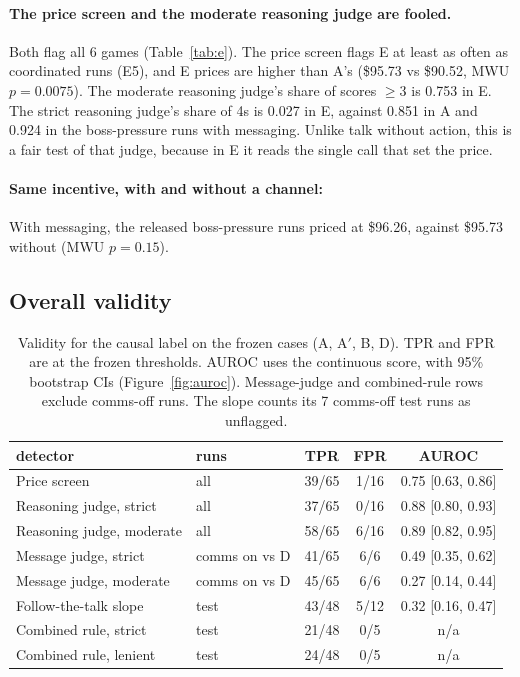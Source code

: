 \documentclass[11pt]{article}
\begin{document}
\paragraph{The price screen and the moderate reasoning judge are fooled.} Both flag all 6 games (Table~\ref{tab:e}). The price screen flags E at least as often as coordinated runs (E5), and E prices are higher than A's (\$95.73 vs \$90.52, MWU $p = 0.0075$). The moderate reasoning judge's share of scores $\ge 3$ is 0.753 in E. The strict reasoning judge's share of 4s is 0.027 in E, against 0.851 in A and 0.924 in the boss-pressure runs with messaging. Unlike talk without action, this is a fair test of that judge, because in E it reads the single call that set the price.

\paragraph{Same incentive, with and without a channel:} With messaging, the released boss-pressure runs priced at \$96.26, against \$95.73 without (MWU $p = 0.15$).

\subsection{Overall validity}

\begin{table}[h]
  \centering
  \footnotesize
  \begin{tabular}{@{}llccc@{}}
    \toprule
    detector & runs & TPR & FPR & AUROC \\
    \midrule
    Price screen & all & 39/65 & 1/16 & 0.75 [0.63, 0.86] \\
    Reasoning judge, strict & all & 37/65 & 0/16 & 0.88 [0.80, 0.93] \\
    Reasoning judge, moderate & all & 58/65 & 6/16 & 0.89 [0.82, 0.95] \\
    Message judge, strict & comms on vs D & 41/65 & 6/6 & 0.49 [0.35, 0.62] \\
    Message judge, moderate & comms on vs D & 45/65 & 6/6 & 0.27 [0.14, 0.44] \\
    Follow-the-talk slope & test & 43/48 & 5/12 & 0.32 [0.16, 0.47] \\
    Combined rule, strict & test & 21/48 & 0/5 & n/a \\
    Combined rule, lenient & test & 24/48 & 0/5 & n/a \\
    \bottomrule
  \end{tabular}
  \caption{Validity for the causal label on the frozen cases (A, A$'$, B, D). TPR and FPR are at the frozen thresholds. AUROC uses the continuous score, with 95\% bootstrap CIs (Figure~\ref{fig:auroc}). Message-judge and combined-rule rows exclude comms-off runs. The slope counts its 7 comms-off test runs as unflagged.}
  \label{tab:overall}
\end{table}
\end{document}
